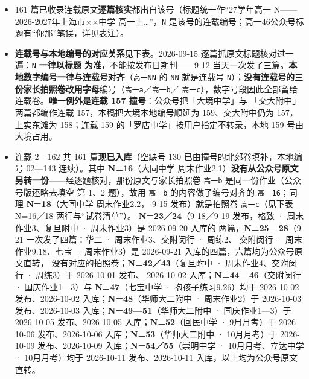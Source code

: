 \documentclass[a4paper,11pt]{article}
\providecommand{\tightlist}{%
  \setlength{\itemsep}{0pt}\setlength{\parskip}{0pt}}
\begin{document}
\begin{itemize}
\tightlist
\item
  161 篇已收录连载原文\textbf{逐篇核实}都出自该号（标题统一作``27学年高一 N------2026-2027年上海市$\times$$\times$中学
  高一上\ldots''，\texttt{N} 是该号的连载编号；高一46公众号标题有``你那''笔误，详见表注）。
\item
  \textbf{连载号与本地编号的对应关系}见下表。2026-09-15 逐篇抓原文标题核对过一遍：\texttt{N} \textbf{一律以标题
  为准}，不能按发布日期判------9-12 当天一次发了三篇。\textbf{本地数字编号一律与连载号对齐}（\texttt{高一NN}
  的 \texttt{NN} 就是连载号 \texttt{N}）；\textbf{没有连载号的三份家长拍照卷改用字母}编号（\texttt{高一a}／\texttt{高一b}／
  \texttt{高一c}），数字号段因此全部留给连载卷。\textbf{唯一例外是连载 157 撞号}：公众号把「大境中学」与
  「交大附中」两篇都编作连载 157，本稿把大境本地编号顺延为 159、交大附中仍为 157，
  上实东滩为 158；连载 159 的「罗店中学」按用户指定不转录，本地 159 号由大境占用。
\item
  连载 2---162 共 161 篇\textbf{现已入库}（空缺号 130 已由撞号的北郊卷填补，本地编号 02---143 连续）。其中 \textbf{N=16}（大同中学 周末作业2.1）\textbf{没有从公众号原文
  另转一份}------经逐题核对，那份原文与家长拍照卷 \texttt{高一b} 是同一份作业（公众号版还略去填空
  第 1、2 题），故用 \texttt{高一b} 的内容做了编号对齐的 \texttt{高一16}；同理 \textbf{N=18}（大同中学 周末作业2.2，
  9-15 发布）就是拍照卷 \texttt{高一c}（见下表 N=16／18 两行与``试卷清单''）。
  \textbf{N=23／24}（9-18／9-19 发布，格致 · 周末作业3、复旦附中 · 周末作业3）是 2026-09-20 入库的
  两篇，\textbf{N=25---28}（9-21 一次发了四篇：华二 · 周末作业3、交附闵行 · 周练2、
  交附闵行 · 周末作业9.18、七宝 · 周末作业3）是 2026-09-21 入库的四篇，六篇均为公众号原文直转，
  没有对应的拍照卷；\textbf{N=42／43}（复旦附中 · 周末作业4、交附闵行 · 周练3）于 2026-10-01 发布、
  2026-10-02 入库；\textbf{N=44---46}（交附闵行 · 国庆作业1---3）与 \textbf{N=47}（七宝中学 · 抱孩子练习9.26）均于 2026-10-02 发布、2026-10-02 入库；\textbf{N=48}（华师大二附中 · 周末作业2）于 2026-10-03 发布、2026-10-03 入库；\textbf{N=49---51}（华师大二附中 · 国庆作业1---3）于 2026-10-05 发布、2026-10-05 入库；\textbf{N=52}（回民中学 · 9月月考）于 2026-10-06 发布、2026-10-06 入库；\textbf{N=53}（华师大二附中 · 10月月考）于 2026-10-09 发布、2026-10-09 入库；\textbf{N=54／55}（崇明中学 · 10月月考、立达中学 · 10月月考）均于 2026-10-11 发布、2026-10-11 入库，以上均为公众号原文直转。
\end{itemize}
\end{document}
